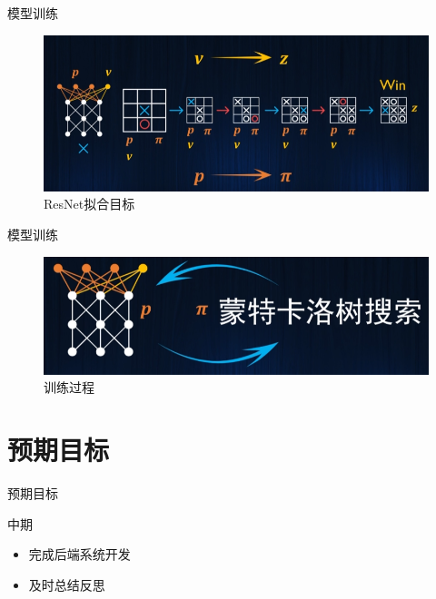\documentclass[compress]{beamer}
\begin{document}
\begin{frame}{模型训练}
  \begin{figure}
    \includegraphics[width=0.9\linewidth]{mt.png}
    \caption{ResNet拟合目标}
  \end{figure}
\end{frame}

\begin{frame}{模型训练}
  \begin{figure}
    \includegraphics[width=0.9\linewidth]{mt2.png}
    \caption{训练过程}
  \end{figure}
\end{frame}

\section{预期目标}

\begin{frame}{预期目标}
  \begin{block}{中期}
    \begin{itemize}
      \setlength{\itemsep}{6pt}
      \item 完成后端系统开发
      \item 及时总结反思
    \end{itemize}
  \end{block}
\end{frame}
\end{document}
